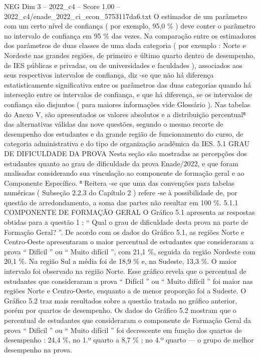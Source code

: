 \begin{textsample}{NEG Dim 3 – 2022\_c4 – Score 1.00 – 2022\_c4/enade\_2022\_ci\_econ\_5753117da6.txt}
O estimador de um parâmetro com um certo nível de confiança ( por exemplo, 95,0 \% ) deve conter o parâmetro no intervalo de confiança em 95 \% das vezes.
Na comparação entre os estimadores dos parâmetros de duas classes de uma dada categoria ( por exemplo : Norte e Nordeste nas grandes regiões, de primeiro e último quarto dentro de desempenho, de IES públicas e privadas, ou de universidades e faculdades ), associados aos seus respectivos intervalos de confiança, diz -se que não há diferença estatisticamente significativa entre os parâmetros das duas categorias quando há interseção entre os intervalos de confiança, e que há diferença, se os intervalos de confiança são disjuntos ( para maiores informações vide Glossário ).
Nas tabelas do Anexo V, são apresentados os valores absolutos e a distribuição percentual⁸ das alternativas válidas das nove questões, segundo o mesmo recorte de desempenho dos estudantes e da grande região de funcionamento do curso, de categoria administrativa e do tipo de organização acadêmica da IES. 5.1 GRAU DE DIFICULDADE DA PROVA Nesta seção são mostradas as percepções dos estudantes quanto ao grau de dificuldade da prova Enade/2022, e que foram analisadas considerando sua vinculação ao componente de formação geral e ao Componente Específico. ⁸ Reitera -se que uma das convenções para tabelas numéricas ( Subseção 2.2.3 do Capítulo 2 ) refere -se à possibilidade de, por questão de arredondamento, a soma das partes não resultar em 100 \%. 5.1.1 COMPONENTE DE FORMAÇÃO GERAL O Gráfico 5.1 apresenta as respostas obtidas para a questão 1 : “ Qual o grau de dificuldade desta prova na parte de Formação Geral? ”.
De acordo com os dados do Gráfico 5.1, as regiões Norte e Centro-Oeste apresentaram o maior percentual de estudantes que consideraram a prova “ Difícil ” ou “ Muito difícil ”, com 21,1 \%, seguida da região Nordeste com 20,1 \%.
Na região Sul a média foi de 18,9 \% e, na Sudeste, 13,3 \%.
O maior intervalo foi observado na região Norte.
Esse gráfico revela que o percentual de estudantes que consideraram a prova “ Difícil ” ou “ Muito difícil ” foi maior nas regiões Norte e Centro-Oeste, enquanto a de menor proporção foi a Sudeste.
O Gráfico 5.2 traz mais resultados sobre a questão tratada no gráfico anterior, porém por quartos de desempenho.
Os dados do Gráfico 5.2 mostram que o percentual de estudantes que consideraram o componente de Formação Geral da prova “ Difícil ” ou “ Muito difícil ” foi decrescente em função dos quartos de desempenho : 24,4 \%, no 1.º quarto a 8,7 \% ; no 4.º quarto — o grupo de melhor desempenho na prova.

\end{textsample}
